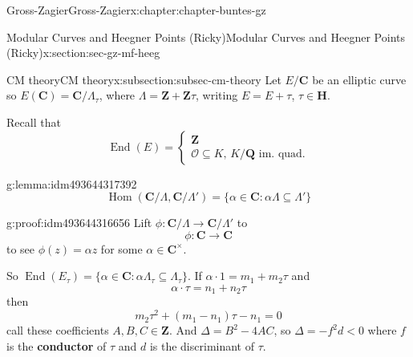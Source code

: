\documentclass[oneside,10pt,]{book}
\newcommand{\terminology}[1]{\textbf{#1}}
\numberwithin{equation}{section}
\newcommand{\ZZ}{\mathbf{Z}}
\newcommand{\QQ}{\mathbf{Q}}
\newcommand{\CC}{\mathbf{C}}
\newcommand{\HH}{\mathbf{H}}
\newcommand{\ints}{\mathcal{O}}
\DeclareMathOperator{\End}{End}
\DeclareMathOperator{\Hom}{Hom}
\newcommand{\lt}{<}
\begin{document}
\begin{chapterptx}{Gross-Zagier}{}{Gross-Zagier}{}{}{x:chapter:chapter-buntes-gz}
%
%
\typeout{************************************************}
\typeout{************************************************}
%
\begin{sectionptx}{Modular Curves and Heegner Points (Ricky)}{}{Modular Curves and Heegner Points (Ricky)}{}{}{x:section:sec-gz-mf-heeg}
%
%
\typeout{************************************************}
\typeout{************************************************}
%
\begin{subsectionptx}{CM theory}{}{CM theory}{}{}{x:subsection:subsec-cm-theory}
Let \(E/\CC\) be an elliptic curve so \(E(\CC) = \CC/\Lambda_\tau  \), where \(\Lambda  = \ZZ + \ZZ\tau \), writing \(E = E+\tau \), \(\tau  \in \HH\).%
\par
Recall that%
\begin{equation*}
\End(E) = \begin{cases} \ZZ \\ \ints \subseteq K ,\,K/\QQ \text{ im. quad.}\end{cases}
\end{equation*}
%
\begin{lemma}{}{}{g:lemma:idm493644317392}%
%
\begin{equation*}
\Hom(\CC/\Lambda ,\CC/\Lambda')= \{\alpha \in \CC : \alpha  \Lambda  \subseteq \Lambda '\}
\end{equation*}
%
\end{lemma}
\begin{proofptx}{}{g:proof:idm493644316656}
Lift \(\phi  \colon \CC/\Lambda  \to \CC/\Lambda '\) to%
\begin{equation*}
\phi  \colon \CC  \to \CC
\end{equation*}
to see \(\phi (z) = \alpha  z\) for some \(\alpha  \in \CC^\times\).%
\end{proofptx}
So \(\End(E_\tau ) = \{\alpha \in \CC : \alpha  \Lambda _\tau  \subseteq \Lambda _\tau \}\). If \(\alpha  \cdot 1 = m_1 + m_2 \tau \) and%
\begin{equation*}
\alpha \cdot \tau  = n_1 + n_2 \tau 
\end{equation*}
then%
\begin{equation*}
m_2 \tau ^2 + (m_1 - n_1) \tau  - n_1 = 0
\end{equation*}
call these coefficients \(A,B,C \in \ZZ\). And \(\Delta = B^2 - 4AC\), so \(\Delta  = -f^2 d \lt 0\) where \(f\) is the \terminology{conductor} of \(\tau \) and \(d\) is the discriminant of \(\tau \).%
\par

\end{subsectionptx}
\end{sectionptx}
\end{chapterptx}
\end{document}
